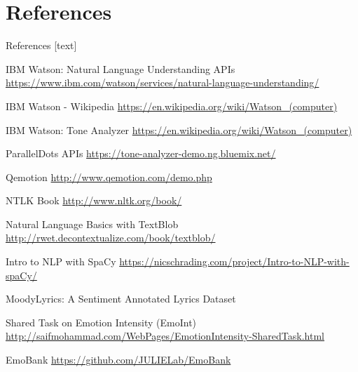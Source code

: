 \documentclass[xcolor=dvipsnames]{beamer}
\begin{document}
\section{References}
\begin{frame}[allowframebreaks]{References}
[text]
 \begin{thebibliography}{99} %
 IBM Watson: Natural Language Understanding APIs
\footnotesize \url{https://www.ibm.com/watson/services/natural-language-understanding/}

 IBM Watson - Wikipedia
\footnotesize \url{https://en.wikipedia.org/wiki/Watson_(computer)}

 IBM Watson: Tone Analyzer
\footnotesize\url{https://en.wikipedia.org/wiki/Watson_(computer)}

 ParallelDots APIs
\footnotesize \url{https://tone-analyzer-demo.ng.bluemix.net/}

 Qemotion
\footnotesize \url{http://www.qemotion.com/demo.php}

 NTLK Book
\footnotesize \url{http://www.nltk.org/book/}

 Natural Language Basics with TextBlob
\footnotesize\url{http://rwet.decontextualize.com/book/textblob/}

 Intro to NLP with SpaCy
\footnotesize\url{https://nicschrading.com/project/Intro-to-NLP-with-spaCy/}

 MoodyLyrics: A Sentiment Annotated Lyrics Dataset

 Shared Task on Emotion Intensity (EmoInt)
\footnotesize\url{http://saifmohammad.com/WebPages/EmotionIntensity-SharedTask.html}

 EmoBank
\footnotesize\url{https://github.com/JULIELab/EmoBank}

\end{thebibliography}

\end{frame}

\end{document}
